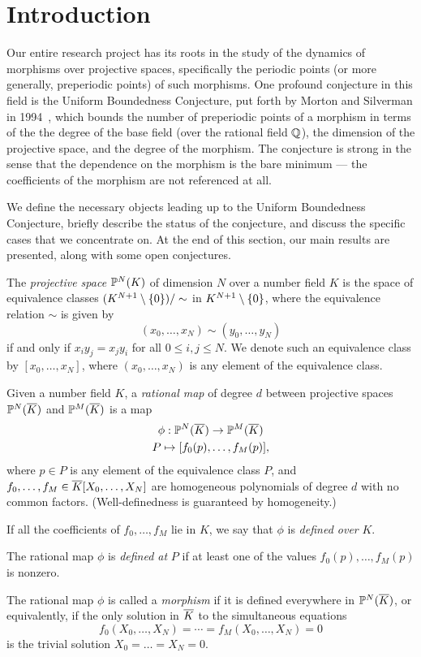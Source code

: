 \section{Introduction}
\label{sec:bg}

Our entire research project has its roots in the study of the dynamics
of morphisms over projective spaces, specifically the periodic points
(or more generally, preperiodic points) of such morphisms. One
profound conjecture in this field is the Uniform Boundedness
Conjecture, put forth by Morton and Silverman in
1994~\cite{MR1264933}, which bounds the number of preperiodic points
of a morphism in terms of the the degree of the base field (over the
rational field $\Q$), the dimension of the projective space, and the
degree of the morphism. The conjecture is strong in the sense that the
dependence on the morphism is the bare minimum --- the coefficients of
the morphism are not referenced at all.

We define the necessary objects leading up to the Uniform Boundedness
Conjecture, briefly describe the status of the conjecture, and discuss
the specific cases that we concentrate on. At the end of this section,
our main results are presented, along with some open conjectures.

\begin{definition}
  The \emph{projective space} $\P^N(K)$ of dimension $N$ over a number
  field $K$ is the space of equivalence classes $(K^{N+1} \setminus
  \set{0})/\sim$ in $K^{N+1} \setminus \set{0}$, where the equivalence
  relation $\sim$ is given by
  \[
  (x_0, \dots, x_N) \sim (y_0, \dots, y_N)
  \]
  if and only if $x_i y_j = x_j y_i$ for all $0 \le i, j \le N$. We
  denote such an equivalence class by $[x_0, \dots, x_N]$, where
  $(x_0, \dots, x_N)$ is any element of the equivalence class.
\end{definition}

\begin{definition}
  Given a number field $K$, a \emph{rational map} of degree $d$
  between projective spaces $\P^N(\ol{K})$ and $\P^M(\ol{K})$ is a
  map
  \[
  \begin{gathered}
    \phi: \P^N(\ol{K}) \to \P^M(\ol{K})\\
    P \mapsto [f_0(p), \dots, f_M(p)],
  \end{gathered}
  \]
  where $p \in P$ is any element of the equivalence class $P$, and
  $f_0, \dots, f_M \in \ol{K}[X_0, \dots, X_N]$ are homogeneous
  polynomials of degree $d$ with no common factors. (Well-definedness
  is guaranteed by homogeneity.)

  If all the coefficients of $f_0, \dots, f_M$ lie in $K$, we say that $\phi$ is \emph{defined over} $K$.

  The rational map $\phi$ is \emph{defined at} $P$ if at least one of
  the values $f_0(p), \dots, f_M(p)$ is nonzero.

  The rational map $\phi$ is called a \emph{morphism} if it is defined
  everywhere in $\P^N(\ol{K})$, or equivalently, if the only solution
  in $\ol{K}$ to the simultaneous equations
  \[
  f_0(X_0, \dots, X_N) = \cdots = f_M(X_0, \dots, X_N) = 0
  \]
  is the trivial solution $X_0 = \dots = X_N = 0$.
\end{definition}

